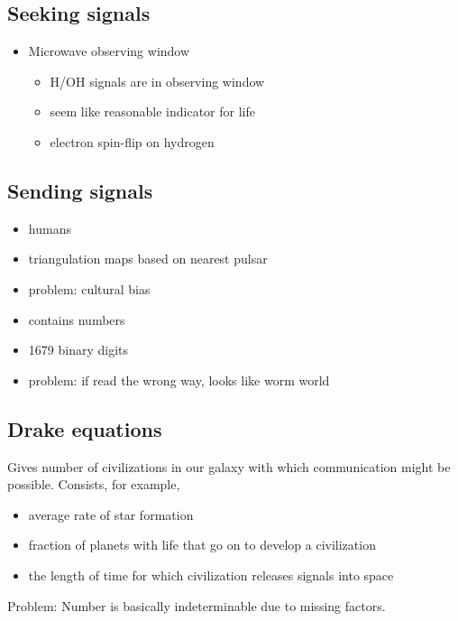 \documentclass{article}
\theoremstyle{sltheorem}
\begin{document}
\subsection{Seeking signals}
\begin{itemize}
    \item Microwave observing window
    \begin{itemize}
        \item H/OH signals are in observing window
        \item seem like reasonable indicator for life
        \item electron spin-flip on hydrogen
    \end{itemize}
\end{itemize}
\subsection{Sending signals}
\begin{itemize}
    \item humans
    \item triangulation maps based on nearest pulsar
    \item problem: cultural bias
\end{itemize}
\begin{itemize}
    \item contains numbers
    \item 1679 binary digits
    \item problem: if read the wrong way, looks like worm world
\end{itemize}
\subsection{Drake equations}
Gives number of civilizations in our galaxy with which communication might be possible.
Consists, for example, 
\begin{itemize}
    \item average rate of star formation
    \item fraction of planets with life that go on to develop a civilization
    \item the length of time for which civilization releases signals into space
\end{itemize}
Problem: Number is basically indeterminable due to missing factors.
\end{document}
